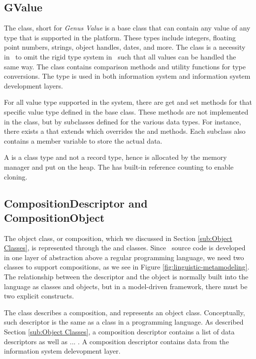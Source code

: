 \subsection{GValue}
\label{sub:GValue}
The  class, short for \textit{Genus Value} is a base class that can contain any value of any type that is supported in the platform. These types include integers, floating point numbers, strings, object handles, dates, and more. The  class is a necessity in \gap~to omit the rigid type system in \delphi~such that all values can be handled the same way. The class contains comparison methods and utility functions for type conversions. The  type is used in both information system and information system development layers.

For all value type supported in the system, there are get and set methods for that specific value type defined in the base class. These methods are not implemented in the  class, but by subclasses defined for the various data types. For instance, there exists a  that extends  which overrides the  and  methods. Each subclass also contains a member variable to store the actual data.

A  is a class type and not a record type, hence is allocated by the memory manager and put on the heap. The  has built-in reference counting to enable cloning.

\subsection{CompositionDescriptor and CompositionObject}
\label{sub:CompositionDescriptor}
The object class, or composition, which we discussed in Section \ref{sub:Object Classes}, is represented through the  and  classes. Since \gap~source code is developed in one layer of abstraction above a regular programming language, we need two classes to support compositions, as we see in Figure \ref{fig:linguistic-metamodeling}. The relationship between the descriptor and the object is normally built into the language as classes and objects, but in a model-driven framework, there must be two explicit constructs.

The  class describes a composition, and represents an object class. Conceptually, such descriptor is the same as a class in a programming language. As described Section \ref{sub:Object Classes}, a composition descriptor contains a list of data descriptors as well as ... . A composition descriptor contains data from the information system delevopment layer.

